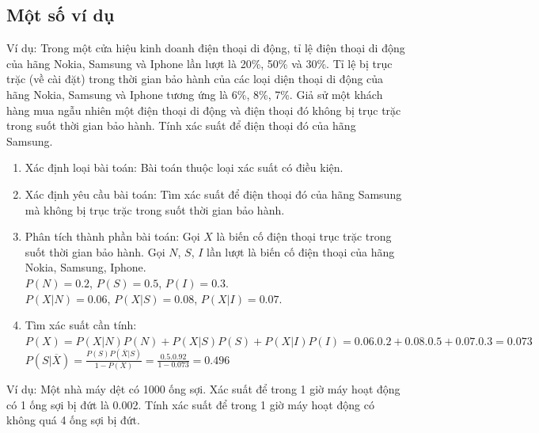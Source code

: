 \documentclass[12pt]{article}
\def\bar#1{\overline{#1}}
\begin{document}
\subsection{Một số ví dụ}
Ví dụ: Trong một cửa hiệu kinh doanh điện thoại di động, tỉ lệ điện
thoại di động của hãng Nokia, Samsung và Iphone lần lượt là 20\%, 50\% và 30\%. Tỉ
lệ bị trục trặc (về cài đặt) trong thời gian bảo hành của các loại diện thoại di động
của hãng Nokia, Samsung và Iphone tương ứng là 6\%, 8\%, 7\%. Giả sử một khách
hàng mua ngẫu nhiên một điện thoại di động và điện thoại đó không bị trục trặc
trong suốt thời gian bảo hành. Tính xác suất để điện thoại đó của hãng Samsung.
\begin{enumerate}
    \item Xác định loại bài toán: Bài toán thuộc loại xác suất có điều kiện.
    \item Xác định yêu cầu bài toán: Tìm xác suất để điện thoại đó của hãng Samsung mà không bị trục trặc trong suốt thời gian bảo hành.
    \item Phân tích thành phần bài toán:
    \subitem Gọi $X$ là biến cố điện thoại trục trặc trong suốt thời gian bảo hành.
    \subitem Gọi $N$, $S$, $I$ lần lượt là biến cố điện thoại của hãng Nokia, Samsung, Iphone. \\ $P(N) = 0.2$, $P(S) = 0.5$, $P(I) = 0.3$.
    \\ $P(X|N) = 0.06$, $P(X|S) = 0.08$, $P(X|I) = 0.07$.
    \item Tìm xác suất cần tính: \\
    $P(X) = P(X|N)P(N) + P(X|S)P(S) + P(X|I)P(I) = 0.06 . 0.2 + 0.08 . 0.5 + 0.07 . 0.3 = 0.073$ \\
    $P(S|\bar{X}) = \frac{P(S)P(\bar{X}|S)}{1-P(X)} = \frac{0.5 . 0.92}{1-0.073} = 0.496$

\end{enumerate}
Ví dụ: Một nhà máy dệt có 1000 ống sợi. Xác suất để trong 1 giờ máy
hoạt động có 1 ống sợi bị đứt là 0.002. Tính xác suất để trong 1 giờ máy hoạt động
có không quá 4 ống sợi bị đứt.
\end{document}

